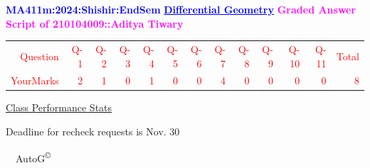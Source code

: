 \documentclass{article}                              %
\begin{document}
%
\vspace*{1in}

\begin{center}
	\textbf{\textcolor{blue}{\LARGE MA411m:2024:Shishir:EndSem}}
	\vskip 1cm
	\textbf{\textcolor{blue}{\underline{\Large Differential Geometry}}}
	\vskip 1cm
	\textbf{\textcolor{magenta}{\LARGE Graded Answer Script of 210104009::Aditya Tiwary}}
\end{center}


\begin{center}
	\Huge 
	\textcolor{red}{
	\begin{tabular}{*{13}{r}}
		Question&Q-1& Q-2& Q-3& Q-4& Q-5& Q-6& Q-7& Q-8& Q-9& Q-10& Q-11&Total  \\
        	YourMarks&2&1&0&1&0&0&4&0&0&0&0&8
	\end{tabular}
	}
        \vskip 2cm
	\large
	\underline{Class Performance Stats}
	\DTLsetseparator{;}
	\begin{table}[htbp]
		\centering
	\end{table}
	\vskip 1cm
	Deadline for recheck requests is Nov. 30
\end{center}
\ \vfill \ \hfill \small AutoG\textsuperscript{\copyright}
\newpage
%
\end{document}
